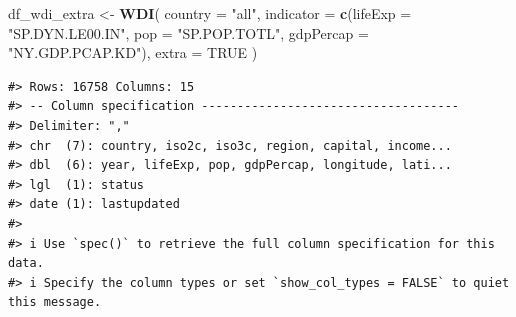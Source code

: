 \documentclass[
  xelatex, ja=standard]{bxjsbook}
\newenvironment{Shaded}{\begin{snugshade}}{\end{snugshade}}
\newcommand{\AttributeTok}[1]{\textcolor[rgb]{0.13,0.29,0.53}{#1}}
\newcommand{\ConstantTok}[1]{\textcolor[rgb]{0.56,0.35,0.01}{#1}}
\newcommand{\FunctionTok}[1]{\textcolor[rgb]{0.13,0.29,0.53}{\textbf{#1}}}
\newcommand{\NormalTok}[1]{#1}
\newcommand{\OtherTok}[1]{\textcolor[rgb]{0.56,0.35,0.01}{#1}}
\newcommand{\StringTok}[1]{\textcolor[rgb]{0.31,0.60,0.02}{#1}}
\theoremstyle{definition}
\theoremstyle{definition}
\theoremstyle{definition}
\theoremstyle{definition}
\theoremstyle{remark}
\begin{document}
\begin{Shaded}
\begin{Highlighting}[]
\NormalTok{df\_wdi\_extra }\OtherTok{\textless{}{-}} \FunctionTok{WDI}\NormalTok{(}
  \AttributeTok{country =} \StringTok{"all"}\NormalTok{, }
  \AttributeTok{indicator =} \FunctionTok{c}\NormalTok{(}\AttributeTok{lifeExp =} \StringTok{"SP.DYN.LE00.IN"}\NormalTok{, }\AttributeTok{pop =} \StringTok{"SP.POP.TOTL"}\NormalTok{, }\AttributeTok{gdpPercap =} \StringTok{"NY.GDP.PCAP.KD"}\NormalTok{), }
  \AttributeTok{extra =} \ConstantTok{TRUE}
\NormalTok{)}
\end{Highlighting}
\end{Shaded}

\begin{verbatim}
#> Rows: 16758 Columns: 15
#> -- Column specification ------------------------------------
#> Delimiter: ","
#> chr  (7): country, iso2c, iso3c, region, capital, income...
#> dbl  (6): year, lifeExp, pop, gdpPercap, longitude, lati...
#> lgl  (1): status
#> date (1): lastupdated
#> 
#> i Use `spec()` to retrieve the full column specification for this data.
#> i Specify the column types or set `show_col_types = FALSE` to quiet this message.
\end{verbatim}
\end{document}
